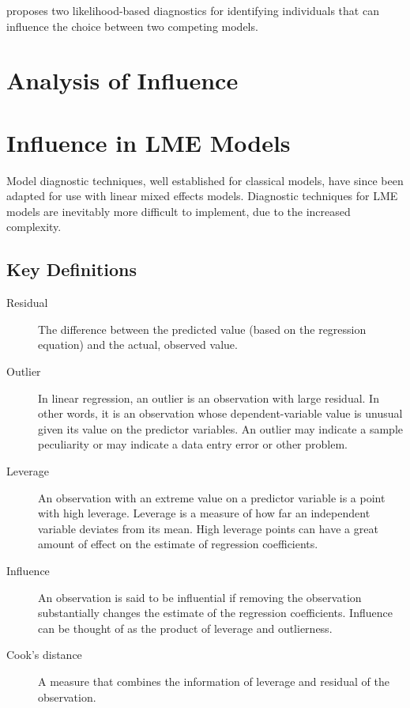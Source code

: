 \documentclass[12pt, a4paper]{article}
\begin{document}
			\citet{Demi} proposes two likelihood-based diagnostics for identifying individuals that can influence the choice between two competing models.
			
			
			
			\section{Analysis of  Influence}
			
			
				
			
			\section{Influence in LME Models}
			
			Model diagnostic techniques, well established for classical models, have since been adapted for use with linear mixed effects models. Diagnostic techniques for LME models are inevitably more difficult to implement, due to the increased complexity.
			

\subsection{Key Definitions}
\begin{description}
	\item[ Residual] The difference between the predicted value (based on the regression equation) and the actual, observed value.
	
	\item[ Outlier] In linear regression, an outlier is an observation with large residual. In other words, it is an observation whose dependent-variable value is unusual given its value on the predictor variables. An outlier may indicate a sample peculiarity or may indicate a data entry error or other problem.
	
	\item[ Leverage] An observation with an extreme value on a predictor variable is a point with high leverage. Leverage is a measure of how far an independent variable deviates from its mean. High leverage points can have a great amount of effect on the estimate of regression coefficients.
	
	\item[ Influence] An observation is said to be influential if removing the observation substantially changes the estimate of the regression coefficients.  Influence can be thought of as the product of leverage and outlierness.
	
	\item[ Cook's distance ] A measure that combines the information of leverage and residual of the observation.
\end{description}
\end{document}
